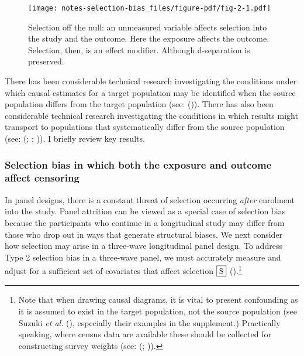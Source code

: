 \documentclass[
  singlecolumn,
  9pt]{article}
\begin{document}
\begin{figure}

{\centering \texttt{[image: notes-selection-bias\_files/figure-pdf/fig-2-1.pdf]}

}

\caption{\label{fig-2}Selection off the null: an unmeasured variable
affects selection into the study and the outcome. Here the exposure
affects the outcome. Selection, then, is an effect modifier. Although
d-separation is preserved.}

\end{figure}

There has been considerable technical research investigating the
conditions under which causal estimates for a target population may be
identified when the source population differs from the target population
(see: ()). There has also
been considerable technical research investigating the conditions in
which results might transport to populations that systematically differ
from the source population (see:
(;
;
)). I briefly review key
results.

\subsubsection{Selection bias in which both the exposure and outcome
affect
censoring}\label{selection-bias-in-which-both-the-exposure-and-outcome-affect-censoring}

In panel designs, there is a constant threat of selection occurring
\emph{after} enrolment into the study. Panel attrition can be viewed as
a special case of selection bias because the participants who continue
in a longitudinal study may differ from those who drop out in ways that
generate structural biases. We next consider how selection may arise in
a three-wave longitudinal panel design. To address Type 2 selection bias
in a three-wave panel, we must accurately measure and adjust for a
sufficient set of covariates that affect selection \(\framebox{S}\)
().\footnote{Note that when
  drawing causal diagrams, it is vital to present confounding as it is
  assumed to exist in the target population, not the source population
  (see Suzuki \emph{et al.} (),
  especially their examples in the supplement.) Practically speaking,
  where census data are available these should be collected for
  constructing survey weights (see: (; )).}
\end{document}
